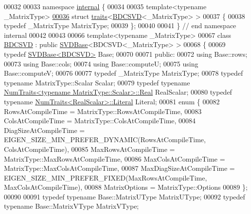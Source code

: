 \begin{DoxyCode}
00032 
00033 \textcolor{keyword}{namespace }\hyperlink{namespaceinternal}{internal} \{
00034 
00035 \textcolor{keyword}{template}<\textcolor{keyword}{typename} \_MatrixType> 
\hyperlink{struct_eigen_1_1internal_1_1traits_3_01_b_d_c_s_v_d_3_01___matrix_type_01_4_01_4}{00036} \textcolor{keyword}{struct }\hyperlink{struct_eigen_1_1internal_1_1traits}{traits}<\hyperlink{group___s_v_d___module_class_eigen_1_1_b_d_c_s_v_d}{BDCSVD}<\_MatrixType> >
00037 \{
00038   \textcolor{keyword}{typedef} \_MatrixType MatrixType;
00039 \};  
00040 
00041 \} \textcolor{comment}{// end namespace internal}
00042   
00043   
00066 \textcolor{keyword}{template}<\textcolor{keyword}{typename} \_MatrixType> 
00067 \textcolor{keyword}{class }\hyperlink{group___s_v_d___module_class_eigen_1_1_b_d_c_s_v_d}{BDCSVD} : \textcolor{keyword}{public} \hyperlink{group___s_v_d___module_class_eigen_1_1_s_v_d_base}{SVDBase}<BDCSVD<\_MatrixType> >
00068 \{
00069   \textcolor{keyword}{typedef} \hyperlink{group___s_v_d___module_class_eigen_1_1_s_v_d_base}{SVDBase<BDCSVD>} Base;
00070     
00071 \textcolor{keyword}{public}:
00072   \textcolor{keyword}{using} Base::rows;
00073   \textcolor{keyword}{using} Base::cols;
00074   \textcolor{keyword}{using} Base::computeU;
00075   \textcolor{keyword}{using} Base::computeV;
00076   
00077   \textcolor{keyword}{typedef} \_MatrixType MatrixType;
00078   \textcolor{keyword}{typedef} \textcolor{keyword}{typename} MatrixType::Scalar Scalar;
00079   \textcolor{keyword}{typedef} \textcolor{keyword}{typename} \hyperlink{group___core___module_struct_eigen_1_1_num_traits}{NumTraits<typename MatrixType::Scalar>::Real}
       RealScalar;
00080   \textcolor{keyword}{typedef} \textcolor{keyword}{typename} \hyperlink{group___core___module_struct_eigen_1_1_num_traits}{NumTraits<RealScalar>::Literal} Literal;
00081   \textcolor{keyword}{enum} \{
00082     RowsAtCompileTime = MatrixType::RowsAtCompileTime, 
00083     ColsAtCompileTime = MatrixType::ColsAtCompileTime, 
00084     DiagSizeAtCompileTime = EIGEN\_SIZE\_MIN\_PREFER\_DYNAMIC(RowsAtCompileTime, ColsAtCompileTime), 
00085     MaxRowsAtCompileTime = MatrixType::MaxRowsAtCompileTime, 
00086     MaxColsAtCompileTime = MatrixType::MaxColsAtCompileTime, 
00087     MaxDiagSizeAtCompileTime = EIGEN\_SIZE\_MIN\_PREFER\_FIXED(MaxRowsAtCompileTime, MaxColsAtCompileTime), 
00088     MatrixOptions = MatrixType::Options
00089   \};
00090 
00091   \textcolor{keyword}{typedef} \textcolor{keyword}{typename} Base::MatrixUType MatrixUType;
00092   \textcolor{keyword}{typedef} \textcolor{keyword}{typename} Base::MatrixVType MatrixVType;

\end{DoxyCode}
